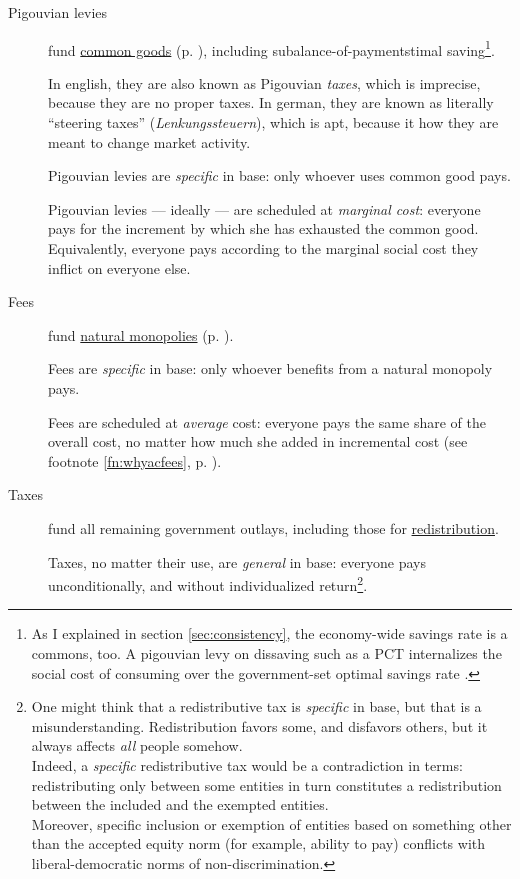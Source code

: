 \begin{description}
	\item[Pigouvian levies]  \label{sec:levies} fund \hyperref[sec:commongood]{common goods} (p. \pageref{sec:commongood}), including subalance-of-paymentstimal saving\footnote{
		As I explained in section \ref{sec:consistency}, the economy-wide savings rate is a commons, too. A pigouvian levy on dissaving such as a \gls{PCT} internalizes the social cost of consuming over the government-set optimal savings rate \citep{Held2010a}.}. %

	In english, they are also known as Pigouvian \emph{taxes}, which is imprecise, because they are no proper taxes. In german, they are known as literally ``steering taxes'' (\emph{Lenkungssteuern}), which is apt, because it how they are meant to change market activity.

	Pigouvian levies are \emph{specific} in base: only whoever uses common good pays. 
	
	Pigouvian levies --- ideally --- are scheduled at \emph{marginal cost}: everyone pays for the increment by which she has exhausted the common good. Equivalently, everyone pays according to the marginal social cost they inflict on everyone else. 

	\item[Fees]  \label{sec:fees}
	fund \hyperref[sec:naturalmonopoly]{natural monopolies} (p. \pageref{sec:naturalmonopoly}). 
	
	Fees are \emph{specific} in base: only whoever benefits from a natural monopoly pays. 
	
	Fees are scheduled at \emph{average} cost: everyone pays the same share of the overall cost, no matter how much she added in incremental cost (see footnote \ref{fn:whyacfees}, p. \pageref{fn:whyacfees}). 

	\item[Taxes]  \label{sec:taxes} fund all remaining government outlays, including those for \hyperref[sec:redistributivepolicy]{redistribution}.
	
	Taxes, no matter their use, are \emph{general} in base: everyone pays unconditionally, and without individualized return\footnote{
		One might think that a redistributive tax is \emph{specific} in base, but that is a misunderstanding. Redistribution favors some, and disfavors others, but it always affects \emph{all} people somehow.\\
		Indeed, a \emph{specific} redistributive tax would be a contradiction in terms: redistributing only between some entities in turn constitutes a redistribution between the included and the exempted entities.\\ Moreover, specific inclusion or exemption of entities based on something other than the accepted equity norm (for example, ability to pay) conflicts with liberal-democratic norms of non-discrimination.}.
	 

\end{description}
